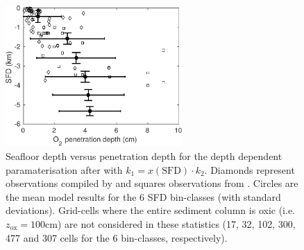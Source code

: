 \documentclass[gmd, manuscript]{copernicus}
\begin{document}
\begin{figure}[htbp]
\begin{center}
	\includegraphics[width=0.6\textwidth]{figures/OMEN-GENIE-Exp/2908_34_Boudreau_depthdep_zox_vs_SFD_with_Glud.pdf}
	\caption{Seafloor depth versus  penetration depth for the depth dependent paramaterisation after \citet{boudreau1997diagenetic} with $k_1 = x(\mathrm{SFD}) \cdot k_2$. 
	Diamonds represent observations compiled by \citet{meile_global_2003} and squares observations from \citet{glud_oxygen_2008}. 
	Circles are the mean model results for the 6 SFD bin-classes (with standard deviations). 
	Grid-cells where the entire sediment column is oxic (i.e. $z_{\mathrm{ox}} = 100$cm) are not considered in these statistics 
	(17, 32, 102, 300, 477 and 307 cells for the 6 bin-classes, respectively). 
	}\label{fig:OMEN_GENIE_Boudreau_depthdep_zox_vs_SFD}
\end{center}
\end{figure}

% 
% 



\end{document}
